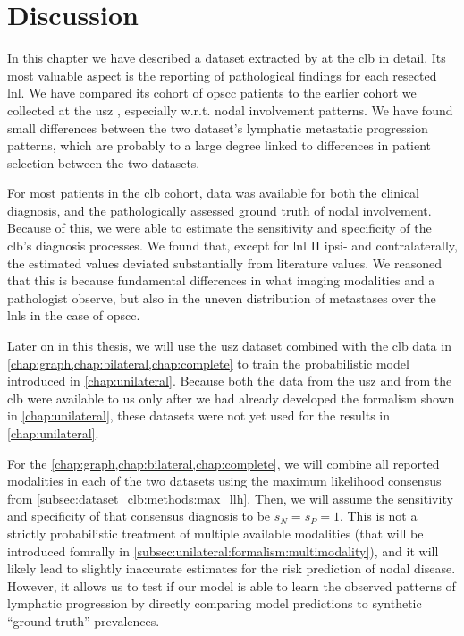 \documentclass[\relativeRoot/main.tex]{subfiles}
\begin{document}
\section{Discussion}
\label{sec:dataset_clb:discussion}

In this chapter we have described a dataset extracted by  at the \gls{clb} in detail. Its most valuable aspect is the reporting of pathological findings for each resected \gls{lnl}. We have compared its cohort of \gls{opscc} patients to the earlier cohort we collected at the \gls{usz} \cite{ludwig_detailed_2022}, especially w.r.t. nodal involvement patterns. We have found small differences between the two dataset's lymphatic metastatic progression patterns, which are probably to a large degree linked to differences in patient selection between the two datasets.

For most patients in the \gls{clb} cohort, data was available for both the clinical diagnosis, and the pathologically assessed ground truth of nodal involvement. Because of this, we were able to estimate the sensitivity and specificity of the \gls{clb}'s diagnosis processes. We found that, except for \gls{lnl} II ipsi- and contralaterally, the estimated values deviated substantially from literature values. We reasoned that this is because fundamental differences in what imaging modalities and a pathologist observe, but also in the uneven distribution of metastases over the \glspl{lnl} in the case of \gls{opscc}.

Later on in this thesis, we will use the \gls{usz} dataset combined with the \gls{clb} data in \cref{chap:graph,chap:bilateral,chap:complete} to train the probabilistic model introduced in \cref{chap:unilateral}. Because both the data from the \gls{usz} and from the \gls{clb} were available to us only after we had already developed the formalism shown in \cref{chap:unilateral}, these datasets were not yet used for the results in \cref{chap:unilateral}.

For the \cref{chap:graph,chap:bilateral,chap:complete}, we will combine all reported modalities in each of the two datasets using the maximum likelihood consensus from \cref{subsec:dataset_clb:methods:max_llh}. Then, we will assume the sensitivity and specificity of that consensus diagnosis to be $s_N = s_P = 1$. This is not a strictly probabilistic treatment of multiple available modalities (that will be introduced fomrally in \cref{subsec:unilateral:formalism:multimodality}), and it will likely lead to slightly inaccurate estimates for the risk prediction of nodal disease. However, it allows us to test if our model is able to learn the observed patterns of lymphatic progression by directly comparing model predictions to synthetic ``ground truth'' prevalences.
\end{document}
